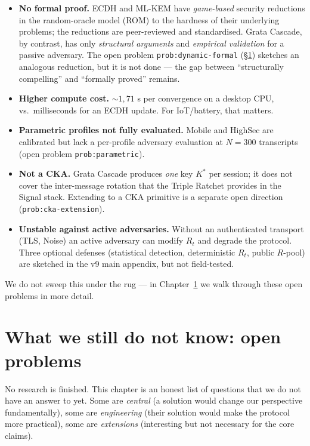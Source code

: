\documentclass[11pt,a4paper]{article}
\begin{document}
\begin{itemize}[leftmargin=*]
\item \textbf{No formal proof.} ECDH and ML-KEM have \emph{game-based} security reductions in the random-oracle model (ROM) to the hardness of their underlying problems; the reductions are peer-reviewed and standardised. Grata Cascade, by contrast, has only \emph{structural arguments} and \emph{empirical validation} for a passive adversary. The open problem \texttt{prob:dynamic-formal} (§\ref{pop:open}) sketches an analogous reduction, but it is not done --- the gap between ``structurally compelling'' and ``formally proved'' remains.
\item \textbf{Higher compute cost.} $\sim 1{,}71$ s per convergence on a desktop CPU, vs.\ milliseconds for an ECDH update. For IoT/battery, that matters.
\item \textbf{Parametric profiles not fully evaluated.} Mobile and HighSec are calibrated but lack a per-profile adversary evaluation at $N = 300$ transcripts (open problem \texttt{prob:parametric}).
\item \textbf{Not a CKA.} Grata Cascade produces \emph{one} key $K^*$ per session; it does not cover the inter-message rotation that the Triple Ratchet provides in the Signal stack. Extending to a CKA primitive is a separate open direction (\texttt{prob:cka-extension}).
\item \textbf{Unstable against active adversaries.} Without an authenticated transport (TLS, Noise) an active adversary can modify $R_t$ and degrade the protocol. Three optional defenses (statistical detection, deterministic $R_t$, public $R$-pool) are sketched in the v9 main appendix, but not field-tested.
\end{itemize}

We do not sweep this under the rug --- in Chapter~\ref{pop:open} we walk through these open problems in more detail.

\section{What we still do not know: open problems}\label{pop:open}

No research is finished. This chapter is an honest list of questions that we do not have an answer to yet. Some are \emph{central} (a solution would change our perspective fundamentally), some are \emph{engineering} (their solution would make the protocol more practical), some are \emph{extensions} (interesting but not necessary for the core claims).
\end{document}
